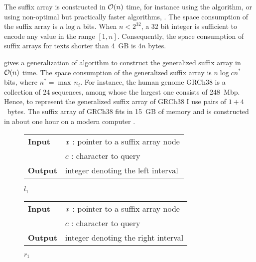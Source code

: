 The suffix array is constructed in $\mathcal{O}(n)$ time, for instance using the \citep{Kaerkkaeinen2003} algorithm, or using non-optimal but practically faster algorithms, \eg \citep{Schuermann2007}.
The space consumption of the suffix array is $n \log{n}$ bits.
When $n < 2^{32}$, a 32 bit integer is sufficient to encode any value in the range $[1,n]$.
Consequently, the space consumption of suffix arrays for texts shorter than 4~GB is $4 n$ bytes.

\citeauthor{Weese2013} gives a generalization of \citeauthor{Kaerkkaeinen2003} algorithm to construct the generalized suffix array in $\mathcal{O}(n)$ time.
The space consumption of the generalized suffix array is $n \log{cn^*}$ bits, where $n^* = \max{\,n_i}$.
For instance, the human genome GRCh38 is a collection of 24 sequences, among whose the largest one consists of 248~Mbp.
Hence, to represent the generalized suffix array of GRCh38 I use pairs of $1+4$~bytes.
The suffix array of GRCh38 fits in 15~GB of memory and is constructed in about one hour on a modern computer \citep{Weese2013}.

\begin{figure*}[t!]
\begin{minipage}[t]{.5\textwidth}
\begin{algorithm}[H]
\begin{tabular}{ll}
\textbf{Input}  & $x$ : pointer to a suffix array node\\
				& $c$ : character to query\\
\textbf{Output} & integer denoting the left interval\\
\end{tabular}
\begin{algorithmic}[1]
	\Else
	\EndIf
\EndWhile
\State \Return $l_1$
\end{algorithmic}
\label{alg:sa-lower}
\end{algorithm}
\end{minipage}
\hfill
\begin{minipage}[t]{.5\textwidth}
\begin{algorithm}[H]
\begin{tabular}{ll}
\textbf{Input}  & $x$ : pointer to a suffix array node\\
				& $c$ : character to query\\
\textbf{Output} & integer denoting the right interval\\
\end{tabular}
\begin{algorithmic}[1]
	\Else
	\EndIf
\EndWhile
\State \Return $r_1$
\end{algorithmic}
\label{alg:sa-upper}
\end{algorithm}
\end{minipage}
\end{figure*}

